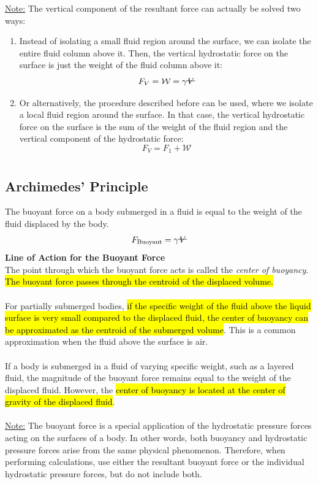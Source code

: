 ﻿\documentclass[12pt]{article}
\newcommand{\vol}{\mathord{\text{\ooalign{\hidewidth $V$\hidewidth\cr\kern-0.5pt\raisebox{0.8ex}{\rule[0pt]{1em}{0.5pt}}}}}}
\begin{document}
\underline{Note:} The vertical component of the resultant force can actually be solved two ways:
\begin{enumerate}
    \item Instead of isolating a small fluid region around the surface, we can isolate the entire fluid column above it. Then, the vertical hydrostatic force on the surface is just the weight of the fluid column above it:
    \[F_V = \mathcal{W} = \gamma \vol\]
    \item Or alternatively, the procedure described before can be used, where we isolate a local fluid region around the surface. In that case, the vertical hydrostatic force on the surface is the sum of the weight of the fluid region and the vertical component of the hydrostatic force:
    \[F_V = F_1 + \mathcal{W}\]
\end{enumerate}
\section*{}
\subsection*{Archimedes' Principle}
The buoyant force on a body submerged in a fluid is equal to the weight of the fluid displaced by the body. 
\[F_{\text{Buoyant}} = \gamma \vol\]
\textbf{Line of Action for the Buoyant Force}\\
The point through which the buoyant force acts is called the \textit{center of buoyancy}. \hl{The buoyant force passes through the centroid of the displaced volume.}\\\\
For partially submerged bodies, \hl{if the specific weight of the fluid above the liquid surface is very small compared to the displaced fluid, the center of buoyancy can be approximated as the centroid of the submerged volume}. This is a common approximation when the fluid above the surface is air.\\\\
If a body is submerged in a fluid of varying specific weight, such as a layered fluid, the magnitude of the buoyant force remains equal to the weight of the displaced fluid. However, the \hl{center of buoyancy is located at the center of gravity of the displaced fluid}.\\\\
\underline{Note:} The buoyant force is a special application of the hydrostatic pressure forces acting on the surfaces of a body. In other words, both buoyancy and hydrostatic pressure forces arise from the same physical phenomenon. Therefore, when performing calculations, use either the resultant buoyant force or the individual hydrostatic pressure forces, but do not include both.
\end{document}
